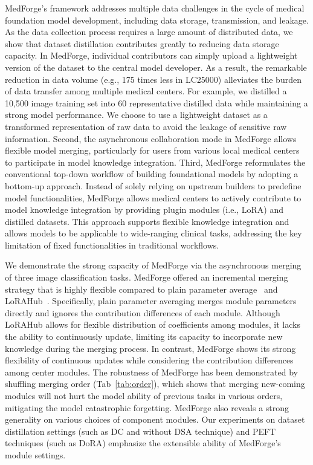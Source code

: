 MedForge's framework addresses multiple data challenges in the cycle of medical foundation model development, including data storage, transmission, and leakage. As the data collection process requires a large amount of distributed data, we show that dataset distillation contributes greatly to reducing data storage capacity. In MedForge, individual contributors can simply upload a lightweight version of the dataset to the central model developer. As a result, the remarkable reduction in data volume (e.g., 175 times less in LC25000) alleviates the burden of data transfer among multiple medical centers. For example, we distilled a 10,500 image training set into 60 representative distilled data while maintaining a strong model performance. We choose to use a lightweight dataset as a transformed representation of raw data to avoid the leakage of sensitive raw information.
Second, the asynchronous collaboration mode in MedForge allows flexible model merging, particularly for users from various local medical centers to participate in model knowledge integration. 
Third, MedForge reformulates the conventional top-down workflow of building foundational models by adopting a bottom-up approach. Instead of solely relying on upstream builders to predefine model functionalities, MedForge allows medical centers to actively contribute to model knowledge integration by providing plugin modules (i.e., LoRA) and distilled datasets. This approach supports flexible knowledge integration and allows models to be applicable to wide-ranging clinical tasks, addressing the key limitation of fixed functionalities in traditional workflows.

We demonstrate the strong capacity of MedForge via the asynchronous merging of three image classification tasks. MedForge offered an incremental merging strategy that is highly flexible compared to plain parameter average~\cite{wortsman2022model} and LoRAHub~\cite{huang2023lorahub}. Specifically, plain parameter averaging merges module parameters directly and ignores the contribution differences of each module. Although LoRAHub allows for flexible distribution of coefficients among modules, it lacks the ability to continuously update, limiting its capacity to incorporate new knowledge during the merging process. In contrast, MedForge shows its strong flexibility of continuous updates while considering the contribution differences among center modules. The robustness of MedForge has been demonstrated by shuffling merging order (Tab~\ref{tab:order}), which shows that merging new-coming modules will not hurt the model ability of previous tasks in various orders, mitigating the model catastrophic forgetting. 
MedForge also reveals a strong generality on various choices of component modules. Our experiments on dataset distillation settings (such as DC and without DSA technique) and PEFT techniques (such as DoRA) emphasize the extensible ability of MedForge's module settings. 

